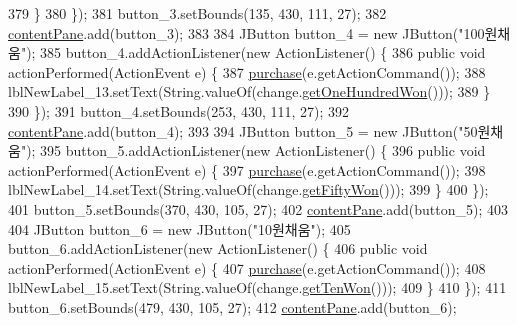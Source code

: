 \begin{DoxyCode}
379             \}
380         \});
381         button\_3.setBounds(135, 430, 111, 27);
382         \hyperlink{class_vending_machine_1_1_machine_u_i_ac8ef25585e46da798d067af0eefa1a03}{contentPane}.add(button\_3);
383         
384         JButton button\_4 = \textcolor{keyword}{new} JButton(\textcolor{stringliteral}{"100원채움"});
385         button\_4.addActionListener(\textcolor{keyword}{new} ActionListener() \{
386             \textcolor{keyword}{public} \textcolor{keywordtype}{void} actionPerformed(ActionEvent e) \{
387                 \hyperlink{class_vending_machine_1_1_machine_u_i_aadccf593dc69281c9ebbfe1fbe09b804}{purchase}(e.getActionCommand());
388                 lblNewLabel\_13.setText(String.valueOf(change.\hyperlink{class_vending_machine_1_1_change_ac814aaff5cfe37b1a71899f750f4d99e}{getOneHundredWon}()));
389             \}
390         \});
391         button\_4.setBounds(253, 430, 111, 27);
392         \hyperlink{class_vending_machine_1_1_machine_u_i_ac8ef25585e46da798d067af0eefa1a03}{contentPane}.add(button\_4);
393         
394         JButton button\_5 = \textcolor{keyword}{new} JButton(\textcolor{stringliteral}{"50원채움"});
395         button\_5.addActionListener(\textcolor{keyword}{new} ActionListener() \{
396             \textcolor{keyword}{public} \textcolor{keywordtype}{void} actionPerformed(ActionEvent e) \{
397                 \hyperlink{class_vending_machine_1_1_machine_u_i_aadccf593dc69281c9ebbfe1fbe09b804}{purchase}(e.getActionCommand());
398                 lblNewLabel\_14.setText(String.valueOf(change.\hyperlink{class_vending_machine_1_1_change_a1ef85014ae005316e4a39db49e8364a7}{getFiftyWon}()));
399             \}
400         \});
401         button\_5.setBounds(370, 430, 105, 27);
402         \hyperlink{class_vending_machine_1_1_machine_u_i_ac8ef25585e46da798d067af0eefa1a03}{contentPane}.add(button\_5);
403         
404         JButton button\_6 = \textcolor{keyword}{new} JButton(\textcolor{stringliteral}{"10원채움"});
405         button\_6.addActionListener(\textcolor{keyword}{new} ActionListener() \{
406             \textcolor{keyword}{public} \textcolor{keywordtype}{void} actionPerformed(ActionEvent e) \{
407                 \hyperlink{class_vending_machine_1_1_machine_u_i_aadccf593dc69281c9ebbfe1fbe09b804}{purchase}(e.getActionCommand());
408                 lblNewLabel\_15.setText(String.valueOf(change.\hyperlink{class_vending_machine_1_1_change_ac6b95aa923e6727f5ecf8095b7f42e99}{getTenWon}()));
409             \}
410         \});
411         button\_6.setBounds(479, 430, 105, 27);
412         \hyperlink{class_vending_machine_1_1_machine_u_i_ac8ef25585e46da798d067af0eefa1a03}{contentPane}.add(button\_6);

\end{DoxyCode}
